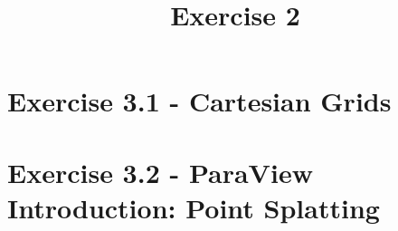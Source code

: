 \documentclass[a4paper]{article}
\date{}
\author{}
\title{Exercise 2}
\begin{document}
	
	\maketitle 
	\thispagestyle{fancy}
	
	\section*{Exercise 3.1 - Cartesian Grids}
	
	
	\section*{Exercise 3.2 - ParaView Introduction: Point Splatting}
	
	
\end{document}
